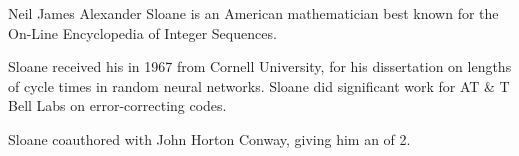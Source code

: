 \documentclass[12pt]{article}
\begin{document}
Neil James Alexander Sloane is an American mathematician best known for the On-Line Encyclopedia of Integer Sequences.

Sloane received his  in 1967 from Cornell University, for his dissertation on lengths of cycle times in random neural networks. Sloane did significant work for AT \& T Bell Labs on error-correcting codes.

Sloane coauthored   with John Horton Conway, giving him an 
 of 2.
\end{document}
